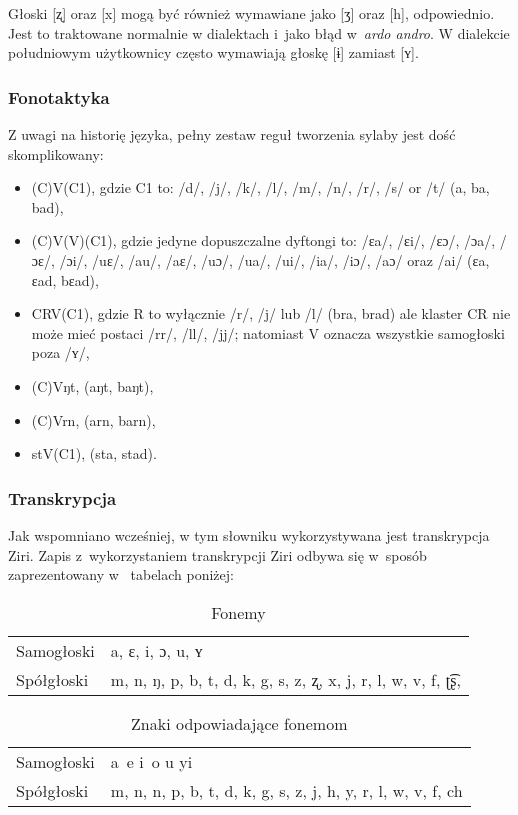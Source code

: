 \begin{spacing}{1.1}
Głoski [ʐ] oraz [x] mogą być również wymawiane jako [ʒ] oraz [h], odpowiednio.
Jest to traktowane normalnie w dialektach i~jako błąd w~\emph{ardo andro}. W
dialekcie południowym użytkownicy często wymawiają głoskę [ɨ] zamiast [ʏ].

\subsubsection{Fonotaktyka}

Z uwagi na historię języka, pełny zestaw reguł tworzenia sylaby jest dość
skomplikowany:

\begin{itemize}
	\item (C)V(C1), gdzie C1 to: /d/, /j/, /k/, /l/, /m/, /n/, /r/, /s/ or /t/ (a, ba, bad),
	\item (C)V(V)(C1), gdzie jedyne dopuszczalne dyftongi to: /ɛa/, /ɛi/, /ɛɔ/, /ɔa/, /ɔɛ/, /ɔi/, /uɛ/, /au/, /aɛ/, /uɔ/, /ua/, /ui/, /ia/, /iɔ/, /aɔ/ oraz /ai/ (ɛa, ɛad, bɛad),
	\item CRV(C1), gdzie R to wyłącznie /r/, /j/ lub /l/ (bra, brad) ale klaster CR nie może mieć postaci /rr/, /ll/, /jj/; natomiast V oznacza wszystkie samogłoski poza /ʏ/,
	\item (C)Vŋt, (aŋt, baŋt),
	\item (C)Vrn, (arn, barn),
	\item stV(C1), (sta, stad).
\end{itemize}

\subsubsection{Transkrypcja}

Jak wspomniano wcześniej, w tym słowniku wykorzystywana jest transkrypcja Ziri. 
Zapis z~wykorzystaniem transkrypcji Ziri odbywa się w~sposób zaprezentowany w~
tabelach poniżej:

\begin{table}[ht]
	\centering
	\caption{Fonemy}
	\begin{tabular}{ll} \toprule
		Samogłoski & a, ɛ, i, ɔ, u, ʏ \\
		Spółgłoski & m, n, ŋ, p, b, t, d, k, g, s, z, ʐ, x, j, r, l, w, v, f, ʈ͡ʂ, \\\bottomrule
	\end{tabular}
	\label{tab:phonemes}
\end{table}

\begin{table}[ht]
\centering
\caption{Znaki odpowiadające fonemom}
\begin{tabular}{ll} \toprule
	Samogłoski & a~e i~o u yi \\
	Spółgłoski & m, n, n, p, b, t, d, k, g, s, z, j, h, y, r, l, w, v, f, ch \\\bottomrule
\end{tabular}
\label{tab:chars}
\end{table}


\end{spacing}
